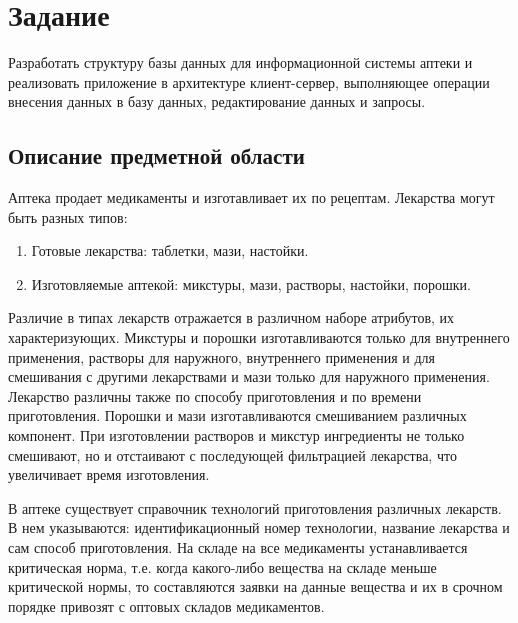 \documentclass[a4paper]{article}
\begin{document}
	
	
	\tableofcontents
	
	\section{Задание}
		Разработать структуру базы данных для информационной системы аптеки и реализовать приложение в архитектуре клиент-сервер, выполняющее операции внесения данных в базу данных, редактирование данных и запросы.
		
		\subsection{Описание предметной области}
			Аптека продает медикаменты и изготавливает их по рецептам. Лекарства могут быть разных типов:
			\begin{enumerate}
				\item Готовые лекарства: таблетки, мази, настойки.
				
				\item Изготовляемые аптекой: микстуры, мази, растворы, настойки, порошки.
			\end{enumerate}
			Различие в типах лекарств отражается в различном наборе атрибутов, их характеризующих. Микстуры и порошки изготавливаются только для внутреннего применения, растворы для наружного, внутреннего применения и для смешивания с другими лекарствами и мази только для наружного применения. Лекарство различны также по способу приготовления и по времени приготовления. Порошки и мази изготавливаются смешиванием различных компонент. При изготовлении растворов и микстур ингредиенты не только смешивают, но и отстаивают с последующей фильтрацией лекарства, что увеличивает время изготовления.
			
			В аптеке существует справочник технологий приготовления различных лекарств. В нем указываются: идентификационный номер технологии, название лекарства и сам способ приготовления. На складе на все медикаменты устанавливается критическая норма, т.е. когда какого-либо вещества на складе меньше критической нормы, то составляются заявки на данные вещества и их в срочном порядке привозят с оптовых складов медикаментов.
			
\end{document}

